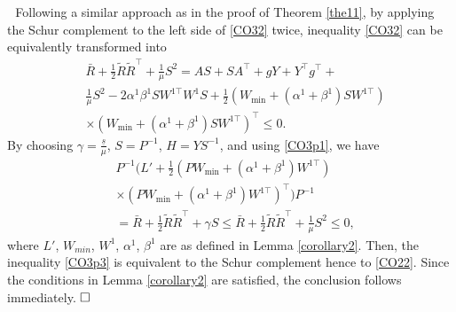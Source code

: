 \documentclass[journal,twoside,web]{ieeecolor}
\renewenvironment{proof}{\vspace{.1cm}\noindent{\sc Proof.}\hspace{0.10cm}\,\,}{$\hfill\Box$\vspace{.1cm}}
\begin{document}
\begin{proof}
Following a similar approach as in the proof of Theorem \ref{the11}, by applying the Schur complement to the left side of \eqref{CO32} twice, inequality \eqref{CO32} can be equivalently transformed into
\begin{equation}\label{CO3p1}
\begin{aligned}
&\bar{R}+\frac{1}{2}\tilde{R}\tilde{R}^{\top}+\frac{1}{\mu}S^2=
AS+SA^\top+gY+Y^\top g^\top+\\&\frac{1}{\mu}S^2-2\alpha^1\beta^1SW^{1\top}W^{1}S+\frac{1}{2}(W_{\min}+(\alpha^1+\beta^1)SW^{1\top})\\&\times(W_{\min}+(\alpha^1+\beta^1)SW^{1\top})^\top\leq 0.
\end{aligned}
\end{equation}
By choosing $\gamma=\frac{\underline{s}}{\mu}$, $S=P^{-1}$, $H=YS^{-1}$, and using \eqref{CO3p1}, we have
\begin{equation}\label{CO3p3}
\begin{aligned}
&P^{-1}\Big(L'+\frac{1}{2}(PW_{\min}+(\alpha^1+\beta^1)W^{1\top})\\&\times(PW_{\min}+(\alpha^1+\beta^1)W^{1\top})^\top\Big)P^{-1}\\&=\bar{R}+\frac{1}{2}\tilde{R}\tilde{R}^{\top}+\gamma S
\leq
\bar{R}+\frac{1}{2}\tilde{R}\tilde{R}^{\top}+\frac{1}{\mu}S^2\leq 0,
\end{aligned}
\end{equation}
where $L'$, $W_{min}$, $W^1$, $\alpha^1$, $\beta^1$ are as defined in Lemma \ref{corollary2}. Then, the inequality \eqref{CO3p3} is equivalent to the Schur complement hence to \eqref{CO22}. Since the conditions in Lemma \ref{corollary2} are satisfied, the conclusion follows immediately.  \end{proof}
\end{document}
